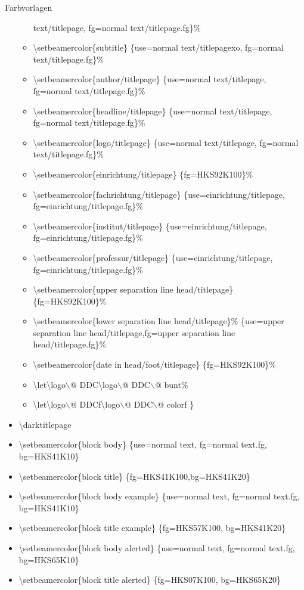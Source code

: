\documentclass[presentation,t]{beamer}
\begin{document}
\begin{frame}[label=sec-2-5-2]{Farbvorlagen}
\begin{itemize}
\begin{itemize}
text/titlepage, fg=normal text/titlepage.fg\}\%
\item \textbackslash setbeamercolor\{subtitle\} \{use=normal
text/titlepagexo, fg=normal text/titlepage.fg\}\%
\item \textbackslash setbeamercolor\{author/titlepage\} \{use=normal
text/titlepage, fg=normal text/titlepage.fg\}\%
\item \textbackslash setbeamercolor\{headline/titlepage\} \{use=normal
text/titlepage, fg=normal text/titlepage.fg\}\%
\item \textbackslash setbeamercolor\{logo/titlepage\} \{use=normal
text/titlepage, fg=normal text/titlepage.fg\}\%
\item \textbackslash setbeamercolor\{einrichtung/titlepage\} \{fg=HKS92K100\}\%
\item \textbackslash setbeamercolor\{fachrichtung/titlepage\}
\{use=einrichtung/titlepage, fg=einrichtung/titlepage.fg\}\%
\item \textbackslash setbeamercolor\{institut/titlepage\}
\{use=einrichtung/titlepage, fg=einrichtung/titlepage.fg\}\%
\item \textbackslash setbeamercolor\{professur/titlepage\}
\{use=einrichtung/titlepage, fg=einrichtung/titlepage.fg\}\%
\item \textbackslash setbeamercolor\{upper separation line
head/titlepage\} \{fg=HKS92K100\}\%
\item \textbackslash setbeamercolor\{lower separation line head/titlepage\}\%
\{use=upper separation line head/titlepage,fg=upper separation line
  head/titlepage.fg\}\%
\item \textbackslash setbeamercolor\{date in head/foot/titlepage\} \{fg=HKS92K100\}\%
\item \textbackslash let\textbackslash logo$\backslash$@ DDC\textbackslash logo$\backslash$@ DDC$\backslash$@ bunt\%
\item \textbackslash let\textbackslash logo$\backslash$@ DDCf\textbackslash logo$\backslash$@ DDC$\backslash$@ colorf
\}
\end{itemize}
\item \textbackslash darktitlepage

\item \textbackslash setbeamercolor\{block body\} \{use=normal text,
fg=normal text.fg, bg=HKS41K10\}
\item \textbackslash setbeamercolor\{block title\} \{fg=HKS41K100,bg=HKS41K20\}
\item \textbackslash setbeamercolor\{block body example\} \{use=normal
text, fg=normal text.fg, bg=HKS41K10\}
\item \textbackslash setbeamercolor\{block title example\}
\{fg=HKS57K100, bg=HKS41K20\}
\item \textbackslash setbeamercolor\{block body alerted\} \{use=normal
text, fg=normal text.fg, bg=HKS65K10\}
\item \textbackslash setbeamercolor\{block title alerted\}
\{fg=HKS07K100, bg=HKS65K20\}
\end{itemize}
\end{frame}
\end{document}
